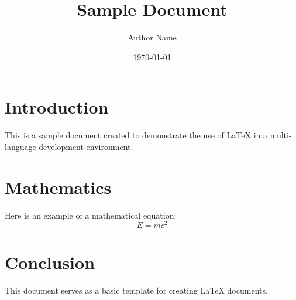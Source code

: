 \documentclass{article}
\title{Sample Document}
\author{Author Name}
\date{\today}
\begin{document}
\maketitle

\section{Introduction}
This is a sample document created to demonstrate the use of LaTeX in a multi-language development environment.

\section{Mathematics}
Here is an example of a mathematical equation:
\begin{equation}
E = mc^2
\end{equation}

\section{Conclusion}
This document serves as a basic template for creating LaTeX documents.
\end{document}
